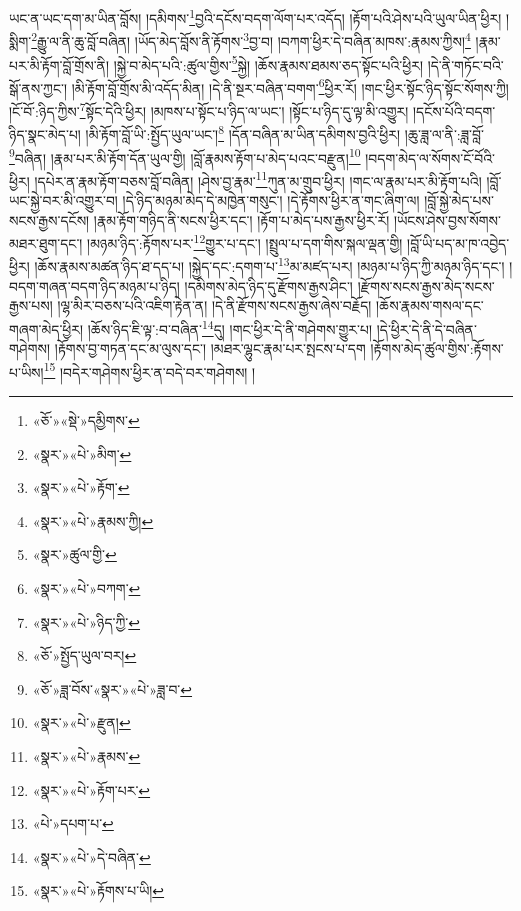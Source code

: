 ཡང་ན་ཡང་དག་མ་ཡིན་བློས། །དམིགས་\footnote{«ཅོ་»«སྡེ་»དམྱིགས་}བྱའི་དངོས་བདག་ལོག་པར་འདོད། །རྟོག་པའི་ཤེས་པའི་ཡུལ་ཡིན་ཕྱིར། །སྨིག་\footnote{«སྣར་»«པེ་»མིག་}རྒྱུ་ལ་ནི་ཆུ་བློ་བཞིན། །ཡོད་མེད་བློས་ནི་རྟོགས་\footnote{«སྣར་»«པེ་»རྟོག་}བྱ་བ། །བཀག་ཕྱིར་དེ་བཞིན་མཁས་:རྣམས་ཀྱིས།\footnote{«སྣར་»«པེ་»རྣམས་ཀྱི།} །རྣམ་པར་མི་རྟོག་བློ་གྲོས་ནི། །སྐྱེ་བ་མེད་པའི་:ཚུལ་གྱིས་\footnote{«སྣར་»ཚུལ་གྱི་}སྐྱེ། །ཆོས་རྣམས་ཐམས་ཅད་སྟོང་པའི་ཕྱིར། །དེ་ནི་གཏོང་བའི་སྒོ་ནས་ཀྱང་། །མི་རྟོག་བློ་གྲོས་མི་འདོད་མིན། །དེ་ནི་སྔར་བཞིན་བགག་\footnote{«སྣར་»«པེ་»བཀག་}ཕྱིར་རོ། །གང་ཕྱིར་སྟོང་ཉིད་སྟོང་སོགས་ཀྱི། །ངོ་བོ་:ཉིད་ཀྱིས་\footnote{«སྣར་»«པེ་»ཉིད་ཀྱི་}སྟོང་དེའི་ཕྱིར། །མཁས་པ་སྟོང་པ་ཉིད་ལ་ཡང་། །སྟོང་པ་ཉིད་དུ་ལྟ་མི་འགྱུར། །དངོས་པོའི་བདག་ཉིད་སྣང་མེད་པ། །མི་རྟོག་བློ་ཡི་:སྤྱོད་ཡུལ་ཡང་།\footnote{«ཅོ་»སྤྱོད་ཡུལ་བར།} །དོན་བཞིན་མ་ཡིན་དམིགས་བྱའི་ཕྱིར། །ཆུ་ཟླ་ལ་ནི་:ཟླ་བློ་\footnote{«ཅོ་»ཟླ་བོས་«སྣར་»«པེ་»ཟླ་བ་}བཞིན། །རྣམ་པར་མི་རྟོག་དོན་ཡུལ་གྱི། །བློ་རྣམས་རྟོག་པ་མེད་པའང་བརྫུན།\footnote{«སྣར་»«པེ་»རྫུན།} །བདག་མེད་ལ་སོགས་ངོ་བོའི་ཕྱིར། །དཔེར་ན་རྣམ་རྟོག་བཅས་བློ་བཞིན། །ཤེས་བྱ་རྣམ་\footnote{«སྣར་»«པེ་»རྣམས་}ཀུན་མ་གྲུབ་ཕྱིར། །གང་ལ་རྣམ་པར་མི་རྟོག་པའི། །བློ་ཡང་སྐྱེ་བར་མི་འགྱུར་བ། །དེ་ཉིད་མཉམ་མེད་དེ་མཁྱེན་གསུང་། །དེ་རྟོགས་ཕྱིར་ན་གང་ཞིག་ལ། །བློ་སྐྱེ་མེད་པས་སངས་རྒྱས་དངོས། །རྣམ་རྟོག་གཉིད་ནི་སངས་ཕྱིར་དང་། །རྟོག་པ་མེད་པས་རྒྱས་ཕྱིར་རོ། །ཡོངས་ཤེས་བྱས་སོགས་མཐར་ཐུག་དང་། །མཉམ་ཉིད་:རྟོགས་པར་\footnote{«སྣར་»«པེ་»རྟོག་པར་}གྱུར་པ་དང་། །སྤྲུལ་པ་དག་གིས་སྐལ་ལྡན་གྱི། །བློ་ཡི་པད་མ་ཁ་འབྱེད་ཕྱིར། །ཆོས་རྣམས་མཚན་ཉིད་ཐ་དད་པ། །སྐྱེད་དང་:དགག་པ་\footnote{«པེ་»དཔག་པ་}མ་མཛད་པར། །མཉམ་པ་ཉིད་ཀྱི་མཉམ་ཉིད་དང་། །བདག་གཞན་བདག་ཉིད་མཉམ་པ་ཉིད། །དམིགས་མེད་ཉིད་དུ་རྫོགས་རྒྱས་ཤིང་། །རྫོགས་སངས་རྒྱས་མེད་སངས་རྒྱས་པས། །ལྷ་མིར་བཅས་པའི་འཇིག་རྟེན་ན། །དེ་ནི་རྫོགས་སངས་རྒྱས་ཞེས་བརྗོད། །ཆོས་རྣམས་གསལ་དང་གཞག་མེད་ཕྱིར། །ཆོས་ཉིད་ཇི་ལྟ་:བ་བཞིན་\footnote{«སྣར་»«པེ་»དེ་བཞིན་}དུ། །གང་ཕྱིར་དེ་ནི་གཤེགས་གྱུར་པ། །དེ་ཕྱིར་དེ་ནི་དེ་བཞིན་གཤེགས། །རྟོགས་བྱ་གཏན་དང་མ་ལུས་དང་། །མཐར་ལྷུང་རྣམ་པར་སྤངས་པ་དག །རྟོགས་མེད་ཚུལ་གྱིས་:རྟོགས་པ་ཡིས།\footnote{«སྣར་»«པེ་»རྟོགས་པ་ཡི།} །བདེར་གཤེགས་ཕྱིར་ན་བདེ་བར་གཤེགས། །
